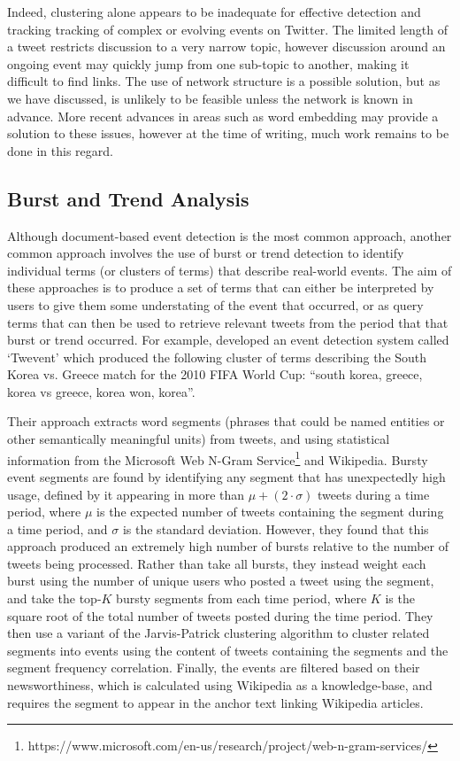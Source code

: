 Indeed, clustering alone appears to be inadequate for effective detection and tracking tracking of complex or evolving events on Twitter.
The limited length of a tweet restricts discussion to a very narrow topic, however discussion around an ongoing event may quickly jump from one sub-topic to another, making it difficult to find links.
The use of network structure is a possible solution, but as we have discussed, is unlikely to be feasible unless the network is known in advance.
More recent advances in areas such as word embedding may provide a solution to these issues, however at the time of writing, much work remains to be done in this regard.

\subsection{Burst and Trend Analysis}
Although document-based event detection is the most common approach, another common approach involves the use of burst or trend detection to identify individual terms (or clusters of terms) that describe real-world events.
The aim of these approaches is to produce a set of terms that can either be interpreted by users to give them some understating of the event that occurred, or as query terms that can then be used to retrieve relevant tweets from the period that that burst or trend occurred.
For example, \cite{Li:2012:TSE:2396761.2396785} developed an event detection system called `Twevent' which produced the following cluster of terms describing the South Korea vs. Greece match for the 2010 FIFA World Cup: ``south korea, greece, korea vs greece, korea won, korea''.

Their approach extracts word segments (phrases that could be named entities or other semantically meaningful units) from tweets, and using statistical information from the Microsoft Web N-Gram Service\footnote{https://www.microsoft.com/en-us/research/project/web-n-gram-services/} and Wikipedia.
Bursty event segments are found by identifying any segment that has unexpectedly high usage, defined by it appearing in more than $\mu + (2 \cdot \sigma)$ tweets during a time period, where $\mu$ is the expected number of tweets containing the segment during a time period, and $\sigma$ is the standard deviation.
However, they found that this approach produced an extremely high number of bursts relative to the number of tweets being processed.
Rather than take all bursts, they instead weight each burst using the number of unique users who posted a tweet using the segment, and take the top-$K$ bursty segments from each time period, where $K$ is the square root of the total number of tweets posted during the time period.
They then use a variant of the Jarvis-Patrick \citep{jarvis1973clustering} clustering algorithm to cluster related segments into events using the content of tweets containing the segments and the segment frequency correlation.
Finally, the events are filtered based on their newsworthiness, which is calculated using Wikipedia as a knowledge-base, and requires the segment to appear in the anchor text linking Wikipedia articles.

